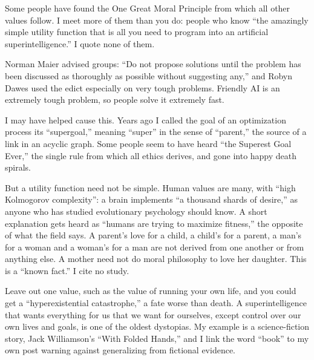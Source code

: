 
Some people have found the One Great Moral Principle from which all other values follow. I meet more of them than you do: people who know ``the amazingly simple utility function that is all you need to program into an artificial superintelligence.'' I quote none of them. 

Norman Maier advised groups: ``Do not propose solutions until the problem has been discussed as thoroughly as possible without suggesting any,'' and Robyn Dawes used the edict especially on very tough problems. Friendly AI is an extremely tough problem, so people solve it extremely fast.

I may have helped cause this. Years ago I called the goal of an optimization process its ``supergoal,'' meaning ``super'' in the sense of ``parent,'' the source of a link in an acyclic graph. Some people seem to have heard ``the Superest Goal Ever,'' the single rule from which all ethics derives, and gone into happy death spirals. 

But a utility function need not be simple. Human values are many, with ``high Kolmogorov complexity'': a brain implements ``a thousand shards of desire,'' as anyone who has studied evolutionary psychology should know. A short explanation gets heard as ``humans are trying to maximize fitness,'' the opposite of what the field says. A parent's love for a child, a child's for a parent, a man's for a woman and a woman's for a man are not derived from one another or from anything else. A mother need not do moral philosophy to love her daughter. This is a ``known fact.'' I cite no study. 

Leave out one value, such as the value of running your own life, and you could get a ``hyperexistential catastrophe,'' a fate worse than death.  A superintelligence that wants everything for us that we want for ourselves, except control over our own lives and goals, is one of the oldest dystopias. My example is a science-fiction story, Jack Williamson's ``With Folded Hands,'' and I link the word ``book'' to my own post warning against generalizing from fictional evidence.

